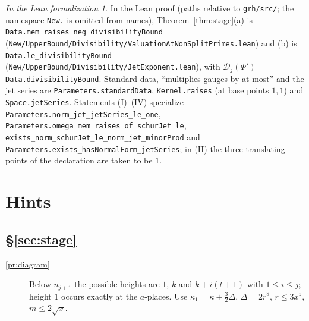 \documentclass[reqno]{amsart}
\theoremstyle{plain}
\theoremstyle{definition}
\theoremstyle{remark}
\newtheorem*{leanremark}{In the Lean formalization}
\newcommand{\Dc}{\mathcal D}
\newcommand{\tl}[1]{\texttt{#1}}
\begin{document}
\begin{leanremark}
\begin{sloppypar}
In the Lean proof \cite{GL} (paths relative to \tl{grh/src/}; the namespace \tl{New.} is omitted from names), Theorem~\ref{thm:stage}(a) is \tl{Data.mem\_\allowbreak raises\_\allowbreak neg\_\allowbreak divisibilityBound} (\tl{New/\allowbreak UpperBound/\allowbreak Divisibility/\allowbreak ValuationAtNonSplitPrimes.lean}) and (b) is \tl{Data.le\_\allowbreak divisibilityBound} (\tl{New/\allowbreak UpperBound/\allowbreak Divisibility/\allowbreak JetExponent.lean}), with \(\Dc_j(\Phi')\) \tl{Data.divisibilityBound}.  Standard data, ``multiplies gauges by at most'' and the jet series are \tl{Parameters.standardData}, \tl{Kernel.raises} (at base points \(1, 1\)) and \tl{Space.jetSeries}.  Statements (I)--(IV) specialize \tl{Parameters.norm\_\allowbreak jet\_\allowbreak jetSeries\_\allowbreak le\_\allowbreak one}, \tl{Parameters.omega\_\allowbreak mem\_\allowbreak raises\_\allowbreak of\_\allowbreak schurJet\_\allowbreak le}, \tl{exists\_\allowbreak norm\_\allowbreak schurJet\_\allowbreak le\_\allowbreak norm\_\allowbreak jet\_\allowbreak minorProd} and \tl{Parameters.exists\_\allowbreak hasNormalForm\_\allowbreak jetSeries}; in (II) the three translating points of the declaration are taken to be \(1\).
\end{sloppypar}
\end{leanremark}

\section*{Hints}

\subsection*{\S\ref{sec:stage}}
\begin{description}
\item[\ref{pr:diagram}] Below \(n_{j+1}\) the possible heights are \(1\), \(k\) and \(k + i(t+1)\) with \(1 \le i \le j\); height \(1\) occurs exactly at the \(a\)-places.  Use \(\kappa_1 = \kappa + \tfrac32\Delta\), \(\Delta = 2r^8\), \(r \le 3x^5\), \(m \le 2\sqrt x\).
\end{description}
\end{document}
